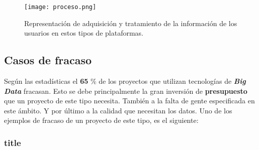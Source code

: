 \documentclass[11pt]{diazessay} %
\begin{document}
\begin{figure}[h!]
	\centering
	\texttt{[image: proceso.png]}
	\caption{Representación de adquisición y tratamiento de la información de los usuarios en estos tipos de plataformas.}
	\label{fig:proceso}
\end{figure}


\subsection*{Casos de fracaso}
Según las estadísticas el \textbf{65} \% de los proyectos que utilizan tecnologías de \textit{\textbf{Big Data}} fracasan. Esto se debe principalmente la gran inversión de \textbf{presupuesto} que un proyecto de este tipo necesita. También a la falta de gente especificada en este ámbito. Y por último a la calidad que necesitan los datos. Uno de los ejemplos de fracaso de un proyecto de este tipo, es el siguiente:\\
 
\subsubsection*{title}









\clearpage




\end{document}
